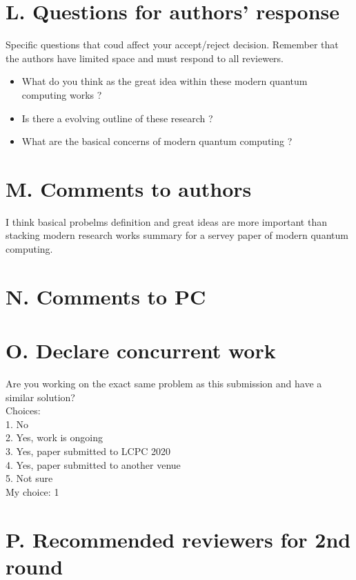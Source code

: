 \documentclass[]{ctexart}
\begin{document}
    \section{L. Questions for authors' response}
    Specific questions that coud affect your accept/reject decision. Remember that 
    the authors have limited space and must respond to all reviewers.
    \begin{itemize}
        \item What do you think as the great idea within these modern quantum computing works ?
        \item Is there a evolving outline of these research ?
        \item What are the basical concerns of modern quantum computing ?
    \end{itemize}
    \section{M. Comments to authors}
        I think basical probelms definition and great ideas are more important than stacking modern research
    works summary for a servey paper of modern quantum computing.
    \section{N. Comments to PC}

    \section{O. Declare concurrent work}
    \noindent Are you working on the exact same problem as this submission and 
    have a similar solution?\\
    Choices:\\
    \hspace*{2em}1. No\\
    \hspace*{2em}2. Yes, work is ongoing\\
    \hspace*{2em}3. Yes, paper submitted to LCPC 2020\\
    \hspace*{2em}4. Yes, paper submitted to another venue\\
    \hspace*{2em}5. Not sure\\
    My choice: 1
    \section{P. Recommended reviewers for 2nd round}
\end{document}
